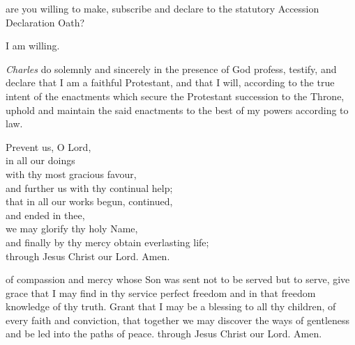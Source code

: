 {\clearpage 
{}

 are you willing to make, subscribe and declare to the
statutory Accession Declaration Oath?

I am willing.


\vfill 



 \textit{Charles} do solemnly and sincerely in the presence of God profess, testify,
and declare that I am a faithful Protestant, and that I will, according to the
true intent of the enactments which secure the Protestant succession to
the Throne, uphold and maintain the said enactments to the best of my
powers according to law.
\vfill 


\vfill 

\begin{center}
	
Prevent us, O Lord,\\ in all our doings \\with thy most gracious favour, \\and
further us with thy continual help;\\ that in all our works begun, continued,\\
and ended in thee,\\ we may glorify thy holy Name, \\and finally by thy mercy
obtain everlasting life; \\through Jesus Christ our Lord.
Amen.
\end{center}

\vfill 


 of compassion and mercy
whose Son was sent not to be served but to serve,
give grace that I may find in thy service perfect freedom
and in that freedom knowledge of thy truth.
Grant that I may be a blessing to all thy children, of every faith and conviction,
that together we may discover the ways of gentleness
and be led into the paths of peace.
through Jesus Christ our Lord.
Amen.
\vfill 
\clearpage

\mbox{}


}
